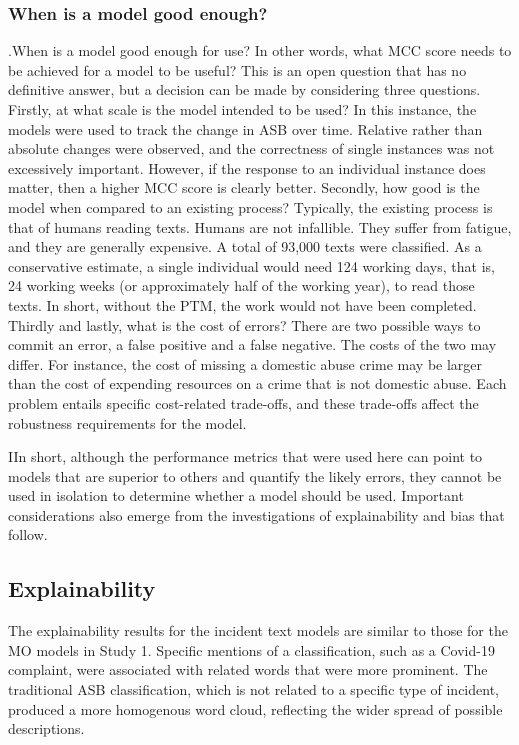  \subsubsection{When is a model good enough?}  .When is a model good enough for use? In other words, what MCC score needs to be achieved for a model to be useful? This is an open question that has no definitive answer, but a decision can be made by considering three questions. Firstly, at what scale is the model intended to be used? In this instance, the models were used to track the change in ASB over time. Relative rather than absolute changes were observed, and the correctness of single instances was not excessively important. However, if the response to an individual instance does matter, then a higher MCC score is clearly better. Secondly, how good is the model when compared to an existing process? Typically, the existing process is that of humans reading texts. Humans are not infallible. They suffer from fatigue, and they are generally expensive. A total of 93,000 texts were classified. As a conservative estimate, a single individual would need 124 working days, that is, 24 working weeks (or approximately half of the working year), to read those texts. In short, without the PTM, the work would not have been completed. Thirdly and lastly, what is the cost of errors? There are two possible ways to commit an error, a false positive and a false negative. The costs of the two may differ. For instance, the cost of missing a domestic abuse crime may be larger than the cost of expending resources on a crime that is not domestic abuse. Each problem entails specific cost-related trade-offs, and these trade-offs affect the robustness requirements for the model. 
 
IIn short, although the performance metrics that were used here can point to models that are superior to others and quantify the likely errors, they cannot be used in isolation to determine whether a model should be used. Important considerations also emerge from the investigations of explainability and bias that follow.


\subsection{Explainability} The explainability results for the incident text models are similar to those for the MO models in Study 1. Specific mentions of a classification, such as a Covid-19 complaint, were associated with related words that were more prominent. The traditional ASB classification, which is not related to a specific type of incident, produced a more homogenous word cloud, reflecting the wider spread of possible descriptions.

